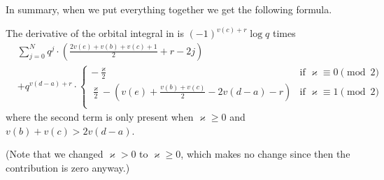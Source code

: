 In summary, when we put everything together we get the following formula.
\begin{proposition}
  \label{prop:semi_lie_derivative_single}
  The derivative of the orbital integral in  is
  $(-1)^{v(c)+r} \log q$ times
  \begin{align*}
    & \sum_{j=0}^N q^j
    \cdot \left( \frac{2v(e)+v(b)+v(c)+1}{2} + r - 2j \right) \\
    & + q^{v(d-a)+r} \cdot
    \begin{cases}
      -\frac{\varkappa}{2} & \text{if }\varkappa \equiv 0 \pmod 2 \\
      \frac{\varkappa}{2} - \left( v(e)+\frac{v(b)+v(c)}{2}-2v(d-a)-r \right)
      & \text{if }\varkappa \equiv 1 \pmod 2 \\
    \end{cases}
  \end{align*}
  where the second term is only present when $\varkappa \ge 0$ and $v(b)+v(c)>2v(d-a)$.
\end{proposition}
(Note that we changed $\varkappa > 0$ to $\varkappa \ge 0$,
which makes no change since then the contribution is zero anyway.)

